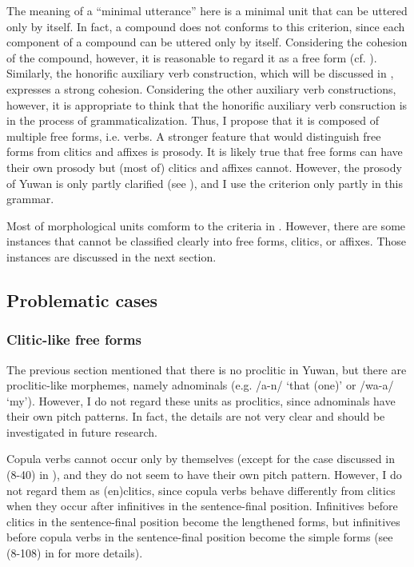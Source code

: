 The meaning of a “minimal utterance” here is a minimal unit that can be uttered only by itself. In fact, a compound does not conforms to this criterion, since each component of a compound can be uttered only by itself. Considering the cohesion of the compound, however, it is reasonable to regard it as a free form (cf. \citealt{DixonAikhenvald2002}). Similarly, the honorific auxiliary verb construction, which will be discussed in , expresses a strong cohesion. Considering the other auxiliary verb constructions, however, it is appropriate to think that the honorific auxiliary verb consruction is in the process of grammaticalization. Thus, I propose that it is composed of multiple free forms, i.e. verbs. A stronger feature that would distinguish free forms from clitics and affixes is prosody. It is likely true that free forms can have their own prosody but (most of) clitics and affixes cannot. However, the prosody of Yuwan is only partly clarified (see ), and I use the criterion only partly in this grammar.

  Most of morphological units comform to the criteria in . However, there are some instances that cannot be classified clearly into free forms, clitics, or affixes. Those instances are discussed in the next section.

\subsection{Problematic cases}\label{sec:4.2.2}
\subsubsection{Clitic-like free forms}\label{sec:4.2.2.1}

The previous section mentioned that there is no proclitic in Yuwan, but there are proclitic-like morphemes, namely adnominals (e.g. /a-n/ ‘that (one)’ or /wa-a/ ‘my’). However, I do not regard these units as proclitics, since adnominals have their own pitch patterns. In fact, the details are not very clear and should be investigated in future research.

Copula verbs cannot occur only by themselves (except for the case discussed in (8-40) in ), and they do not seem to have their own pitch pattern. However, I do not regard them as (en)clitics, since copula verbs behave differently from clitics when they occur after infinitives in the sentence-final position. Infinitives before clitics in the sentence-final position become the lengthened forms, but infinitives before copula verbs in the sentence-final position become the simple forms (see (8-108) in  for more details).

